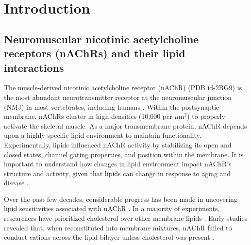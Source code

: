\section{Introduction}
\label{intro}
\subsection{Neuromuscular nicotinic acetylcholine receptors (nAChRs) and their lipid interactions}
\label{sec:1}
The muscle-derived nicotinic acetylcholine receptor (nAChR) (PDB id-2BG9)\cite{Unwin2005} is the most abundant neurotransmitter receptor at the neuromuscular junction (NMJ) in most vertebrates, including humans \cite{Albuquerque2009}. Within the postsynaptic membrane, nAChRs cluster in high densities (10,000 per $\mu$m$^{2}$) to properly activate the skeletal muscle\cite{Ramarao1998,Breckenridge1972}. As a major transmembrane protein, nAChR depends upon a highly specific lipid environment to maintain functionality. Experimentally, lipids influenced nAChR activity by stabilizing its open and closed states\cite{Criado1982}, channel gating properties\cite{daCosta_A_2013}, and position within the membrane\cite{Almarza2014}. It is important to understand how changes in lipid environment impact nAChR's structure and activity, given that lipids can change in response to aging and disease \cite{Yadav2014}. 

Over the past few decades, considerable progress has been made in uncovering lipid sensitivities associated with nAChR \cite{Criado1982}. In a majority of experiments, researchers have prioritized cholesterol over other membrane lipids \cite{Narayanaswami1993,Leibel1987,Marsh1978,POPOT1978}. Early studies revealed that, when reconstituted into membrane mixtures, nAChR failed to conduct cations across the lipid bilayer unless cholesterol was present \cite{Fong_Correlation_1986,Sunshine_Lipid_1992,Butler1993,Fong_Stabilization_1987,Corrie_Lipid_2002}. 
